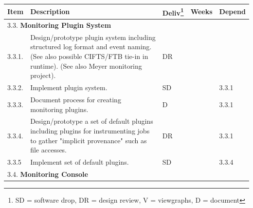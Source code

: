 \begin{longtable}{|p{1cm}|p{10.2cm}|p{1cm}|p{1cm}|p{1.8cm}|}\hline
  \textbf{Item} & \textbf{Description}
                & \textbf{Deliv}\footnote{SD = software drop,
                        DR = design review, V = viewgraphs, D = document}
                & \textbf{Weeks} & \textbf{Depend} \\
  \hline
  \hline
  \multicolumn{5}{|l|}{3.3. \textbf{Monitoring Plugin System}} \\
  \hline
  3.3.1.& Design/prototype plugin system including structured log format
	  and event naming.  (See also possible CIFTS/FTB tie-in in runtime).
          (See also Meyer monitoring project).
	& DR
	&
	& \\
  \hline
  3.3.2.& Implement plugin system.
        & SD
        &
        & 3.3.1 \\
  \hline
  3.3.3.& Document process for creating monitoring plugins.
        & D
        &
        & 3.3.1 \\
  \hline
  3.3.4.& Design/prototype a set of default plugins including plugins
          for instrumenting jobs to gather "implicit provenance" such as
          file accesses.
        & DR
        & 
        & 3.3.1 \\
  \hline
  3.3.5 & Implement set of default plugins.
        & SD
        &
        & 3.3.4 \\

  \hline
  \multicolumn{5}{|l|}{3.4. \textbf{Monitoring Console}} \\
  \hline


\end{longtable}

